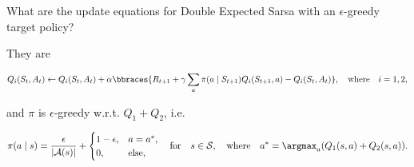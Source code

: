 
\begin{exercise}[Exercise 6.13]

What are the update equations for Double Expected Sarsa with an $\epsilon$-greedy target policy?

\end{exercise}


\begin{solution}

They are

\begin{align*}
    Q_i(S_t, A_t)
    \leftarrow
    Q_i(S_t, A_t) + \alpha \bbraces{R_{t+1} + \gamma \sum_a \pi(a \mid S_{t+1}) Q_i(S_{t+1}, a) - Q_i(S_t, A_t)},
    \quad
    \text{where}
    \quad
    i = 1, 2,
\end{align*}

and $\pi$ is $\epsilon$-greedy w.r.t. $Q_1 + Q_2$, i.e.

\begin{align*}
    \pi(a \mid s)
    =
    \frac{\epsilon}{|\mathcal A(s)|}
    +
    \begin{cases}
        1 - \epsilon, & a = a^\ast, \\
        0,            & \text{else},
    \end{cases}
    \quad
    \text{for}
    \quad
    s \in \mathcal S,
    \quad
    \text{where}
    \quad
    a^\ast = \argmax_a (Q_1(s, a) + Q_2(s, a)).
\end{align*}

\end{solution}

